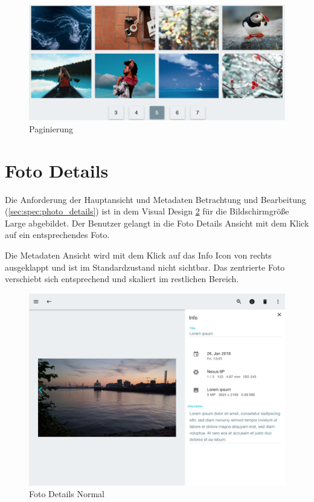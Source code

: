 \begin{figure}[htp]     %
\centering
\includegraphics[width=1.0\textwidth]{images/pagination} 
\caption{Paginierung}\label{fig:pagination}
\end{figure}

\section{Foto Details}
Die Anforderung der Hauptansicht und Metadaten Betrachtung und Bearbeitung (\ref{sec:spec:photo_details}) ist in dem Visual Design \ref{fig:form_normal} für die Bildschirmgröße Large abgebildet. Der Benutzer gelangt in die Foto Details Ansicht mit dem Klick auf ein entsprechendes Foto. 

Die Metadaten Ansicht wird mit dem Klick auf das Info Icon von rechts ausgeklappt und ist im Standardzustand nicht sichtbar. Das zentrierte Foto verschiebt sich entsprechend und skaliert im restlichen Bereich.

\begin{figure}[htp]     %
\centering
\includegraphics[width=1.0\textwidth]{images/form_normal} 
\caption{Foto Details Normal}\label{fig:form_normal}
\end{figure}

